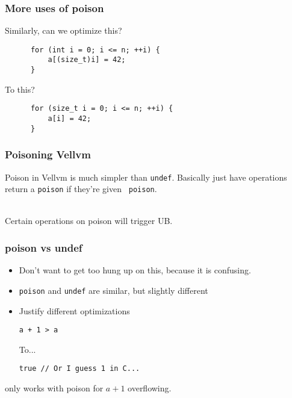 \documentclass{beamer}
\begin{document}
\begin{frame}[fragile]
  \frametitle{More uses of poison}
  Similarly, can we optimize this?
  
\begin{lstlisting}
      for (int i = 0; i <= n; ++i) {
          a[(size_t)i] = 42;
      }
\end{lstlisting}

  \pause To this?

\begin{lstlisting}
      for (size_t i = 0; i <= n; ++i) {
          a[i] = 42;
      }
\end{lstlisting}

\end{frame}

\begin{frame}
  \frametitle{Poisoning Vellvm}

  Poison in Vellvm is much simpler than {\tt undef}. Basically just
  have operations return a {\tt poison} if they're given {\tt
    poison}.\\~

  Certain operations on poison will trigger UB.
  
\end{frame}

\begin{frame}[fragile]
  \frametitle{poison vs undef}

  \begin{itemize}
  \item Don't want to get too hung up on this, because it is
    confusing.
  \item {\tt poison} and {\tt undef} are similar, but  slightly
    different
  \item  Justify different optimizations

\begin{lstlisting}
a + 1 > a
\end{lstlisting}

    To...

\begin{lstlisting}
true // Or I guess 1 in C...
\end{lstlisting}
  \end{itemize}

  only works with poison for $a + 1$ overflowing.
\end{frame}
\end{document}
